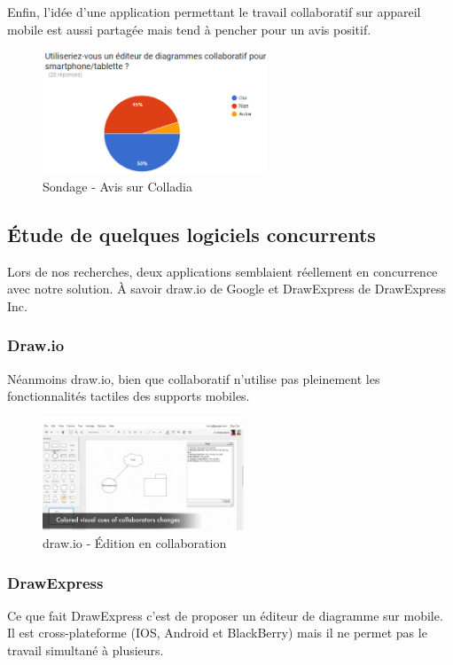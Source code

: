 \vspace{200pt}

Enfin, l'idée d'une application permettant le travail collaboratif sur appareil mobile est aussi partagée mais tend à pencher pour un avis positif.

\begin{figure}[!h]
	\centering
	\includegraphics[width=0.6\textwidth]{img/sondage_colladia}
	\caption{Sondage - Avis sur Colladia}
\end{figure}


\newpage
\subsection{Étude de quelques logiciels concurrents}
Lors de nos recherches, deux applications semblaient réellement en concurrence avec notre solution. À savoir draw.io de Google et DrawExpress de DrawExpress Inc.



\subsubsection{Draw.io}
Néanmoins draw.io, bien que collaboratif n'utilise pas pleinement les fonctionnalités tactiles des supports mobiles.

\begin{figure}[!h]
	\centering
	\includegraphics[width=6cm]{img/drawio}
	\caption{draw.io - Édition en collaboration}
\end{figure}




\subsubsection{DrawExpress}
Ce que fait DrawExpress c'est de proposer un éditeur de diagramme sur mobile. Il est cross-plateforme (IOS, Android et BlackBerry) mais il ne permet pas le travail simultané à plusieurs.

